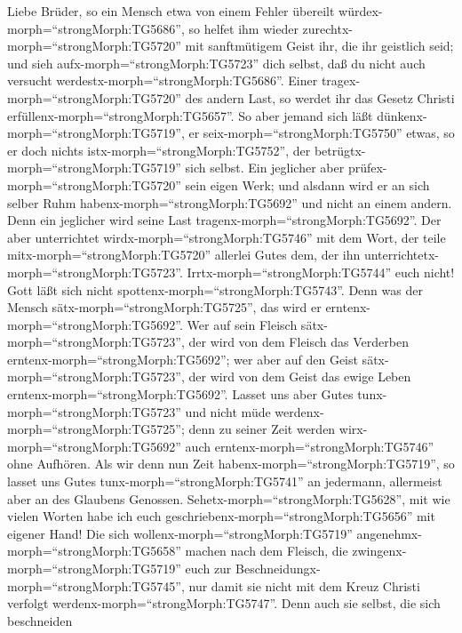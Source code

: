  Liebe Brüder, so ein Mensch etwa von einem Fehler übereilt
würdex-morph=``strongMorph:TG5686'', so helfet ihm wieder
zurechtx-morph=``strongMorph:TG5720'' mit sanftmütigem Geist ihr, die
ihr geistlich seid; und sieh aufx-morph=``strongMorph:TG5723'' dich
selbst, daß du nicht auch versucht
werdestx-morph=``strongMorph:TG5686''.  Einer
tragex-morph=``strongMorph:TG5720'' des andern Last, so werdet ihr das
Gesetz Christi erfüllenx-morph=``strongMorph:TG5657''.  So
aber jemand sich läßt dünkenx-morph=``strongMorph:TG5719'', er
seix-morph=``strongMorph:TG5750'' etwas, so er doch nichts
istx-morph=``strongMorph:TG5752'', der
betrügtx-morph=``strongMorph:TG5719'' sich selbst.  Ein
jeglicher aber prüfex-morph=``strongMorph:TG5720'' sein eigen Werk; und
alsdann wird er an sich selber Ruhm habenx-morph=``strongMorph:TG5692''
und nicht an einem andern.  Denn ein jeglicher wird seine
Last tragenx-morph=``strongMorph:TG5692''.  Der aber
unterrichtet wirdx-morph=``strongMorph:TG5746'' mit dem Wort, der teile
mitx-morph=``strongMorph:TG5720'' allerlei Gutes dem, der ihn
unterrichtetx-morph=``strongMorph:TG5723''. 
Irrtx-morph=``strongMorph:TG5744'' euch nicht! Gott läßt sich nicht
spottenx-morph=``strongMorph:TG5743''. Denn was der Mensch
sätx-morph=``strongMorph:TG5725'', das wird er
erntenx-morph=``strongMorph:TG5692''.  Wer auf sein Fleisch
sätx-morph=``strongMorph:TG5723'', der wird von dem Fleisch das
Verderben erntenx-morph=``strongMorph:TG5692''; wer aber auf den Geist
sätx-morph=``strongMorph:TG5723'', der wird von dem Geist das ewige
Leben erntenx-morph=``strongMorph:TG5692''.  Lasset uns aber
Gutes tunx-morph=``strongMorph:TG5723'' und nicht müde
werdenx-morph=``strongMorph:TG5725''; denn zu seiner Zeit werden
wirx-morph=``strongMorph:TG5692'' auch
erntenx-morph=``strongMorph:TG5746'' ohne Aufhören.  Als
wir denn nun Zeit habenx-morph=``strongMorph:TG5719'', so lasset uns
Gutes tunx-morph=``strongMorph:TG5741'' an jedermann, allermeist aber an
des Glaubens Genossen. 
Sehetx-morph=``strongMorph:TG5628'', mit wie vielen Worten habe ich euch
geschriebenx-morph=``strongMorph:TG5656'' mit eigener Hand!
 Die sich wollenx-morph=``strongMorph:TG5719''
angenehmx-morph=``strongMorph:TG5658'' machen nach dem Fleisch, die
zwingenx-morph=``strongMorph:TG5719'' euch zur
Beschneidungx-morph=``strongMorph:TG5745'', nur damit sie nicht mit dem
Kreuz Christi verfolgt werdenx-morph=``strongMorph:TG5747''.
 Denn auch sie selbst, die sich beschneiden
